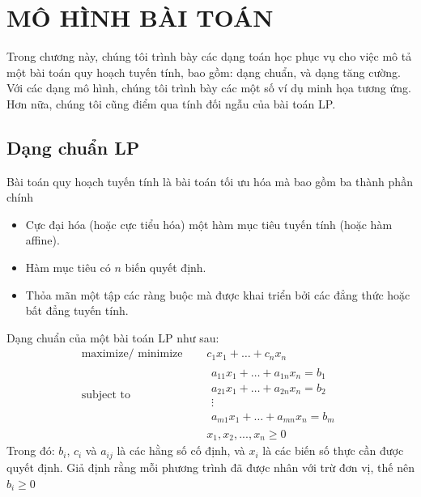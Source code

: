 \chapter{MÔ HÌNH BÀI TOÁN}

Trong chương này, chúng tôi trình bày các dạng toán học phục vụ cho việc mô tả một bài toán quy hoạch tuyến tính, bao gồm: dạng chuẩn, và dạng tăng cường. Với các dạng mô hình, chúng tôi trình bày các một số ví dụ minh họa tương ứng. Hơn nữa, chúng tôi cũng điểm qua tính đối ngẫu của bài toán LP.

\section{Dạng chuẩn LP}

Bài toán quy hoạch tuyến tính là bài toán tối ưu hóa mà bao gồm ba thành phần chính
\begin{itemize}
    \item Cực đại hóa (hoặc cực tiểu hóa) một hàm mục tiêu tuyến tính (hoặc hàm affine).
    \item Hàm mục tiêu có $n$ biến quyết định.
    \item Thỏa mãn một tập các ràng buộc mà được khai triển bởi các đẳng thức hoặc bất đẳng tuyến tính.
\end{itemize}

Dạng chuẩn của một bài toán LP như sau:
\begin{equation}
    \begin{aligned}
        \text{maximize/ minimize } \quad & c_1 x_1 + \dots + c_n x_n \\
        \text{subject to }\quad &
            \begin{array}{c}
            a_{11} x_1 + \dots + a_{1n} x_n = b_1 \\
            a_{21} x_1 + \dots + a_{2n} x_n = b_2 \\
            \vdots \\
            a_{m1} x_1 + \dots + a_{mn} x_n = b_m 
            \end{array} \\ 
            & x_1, x_2, ..., x_n \geq 0
    \end{aligned}   
\end{equation}
Trong đó: $b_i$, $c_i$ và $a_{ij}$ là các hằng số cố định, và $x_i$ là các biến số thực cần được quyết định. Giả định rằng mỗi phương trình đã được nhân với trừ đơn vị, thế nên $b_i \geq 0$

